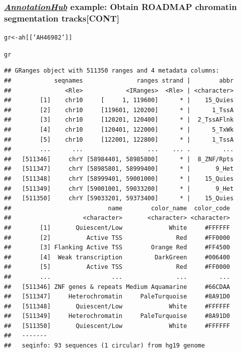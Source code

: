 \documentclass{beamer}\usepackage[]{graphicx}\usepackage[]{color}
\makeatletter
\newcommand{\hlstr}[1]{\textcolor[rgb]{0.192,0.494,0.8}{#1}}%
\newcommand{\hlstd}[1]{\textcolor[rgb]{0.345,0.345,0.345}{#1}}%
\newcommand{\hlkwb}[1]{\textcolor[rgb]{0.69,0.353,0.396}{#1}}%
\newenvironment{kframe}{%
 \def\at@end@of@kframe{}%
 \ifinner\ifhmode%
  \def\at@end@of@kframe{\end{minipage}}%
  \begin{minipage}{\columnwidth}%
 \fi\fi%
 \def\FrameCommand##1{\hskip\@totalleftmargin \hskip-\fboxsep
 \colorbox{shadecolor}{##1}\hskip-\fboxsep
     \hskip-\linewidth \hskip-\@totalleftmargin \hskip\columnwidth}%
 \MakeFramed {\advance\hsize-\width
   \@totalleftmargin\z@ \linewidth\hsize
   \@setminipage}}%
 {\par\unskip\endMakeFramed%
 \at@end@of@kframe}
\newenvironment{knitrout}{}{} %
\newcommand{\Rpackage}[1]{{\usebeamercolor[fg]{structure} \textsl{#1}}}
\newcommand\Biocpkg[1]{%
  {\href{http://bioconductor.org/packages/release/bioc/html/#1.html}%
    {\Rpackage{#1}}}}
\makeatother
\begin{document}
\begin{frame}[fragile]
  \frametitle{\Biocpkg{AnnotationHub} example: Obtain ROADMAP chromatin segmentation tracks[CONT]}
\begin{knitrout}\tiny
{}\color{fgcolor}\begin{kframe}
\begin{alltt}
\hlstd{gr} \hlkwb{<-} \hlstd{ah[[}\hlstr{'AH46982'}\hlstd{]]}
\end{alltt}


{\ttfamily\noindent\itshape\color{messagecolor}{\#\# loading from cache '/home/mvaniterson/.AnnotationHub/52422'}}\begin{alltt}
\hlstd{gr}
\end{alltt}
\begin{verbatim}
## GRanges object with 511350 ranges and 4 metadata columns:
##            seqnames               ranges strand |        abbr
##               <Rle>            <IRanges>  <Rle> | <character>
##        [1]    chr10     [     1, 119600]      * |    15_Quies
##        [2]    chr10     [119601, 120200]      * |      1_TssA
##        [3]    chr10     [120201, 120400]      * |  2_TssAFlnk
##        [4]    chr10     [120401, 122000]      * |      5_TxWk
##        [5]    chr10     [122001, 122800]      * |      1_TssA
##        ...      ...                  ...    ... .         ...
##   [511346]     chrY [58984401, 58985800]      * |  8_ZNF/Rpts
##   [511347]     chrY [58985801, 58999400]      * |       9_Het
##   [511348]     chrY [58999401, 59001000]      * |    15_Quies
##   [511349]     chrY [59001001, 59033200]      * |       9_Het
##   [511350]     chrY [59033201, 59373400]      * |    15_Quies
##                           name        color_name  color_code
##                    <character>       <character> <character>
##        [1]       Quiescent/Low             White     #FFFFFF
##        [2]          Active TSS               Red     #FF0000
##        [3] Flanking Active TSS        Orange Red     #FF4500
##        [4]  Weak transcription         DarkGreen     #006400
##        [5]          Active TSS               Red     #FF0000
##        ...                 ...               ...         ...
##   [511346] ZNF genes & repeats Medium Aquamarine     #66CDAA
##   [511347]     Heterochromatin     PaleTurquoise     #8A91D0
##   [511348]       Quiescent/Low             White     #FFFFFF
##   [511349]     Heterochromatin     PaleTurquoise     #8A91D0
##   [511350]       Quiescent/Low             White     #FFFFFF
##   -------
##   seqinfo: 93 sequences (1 circular) from hg19 genome
\end{verbatim}
\end{kframe}
\end{knitrout}
\end{frame}
\end{document}
